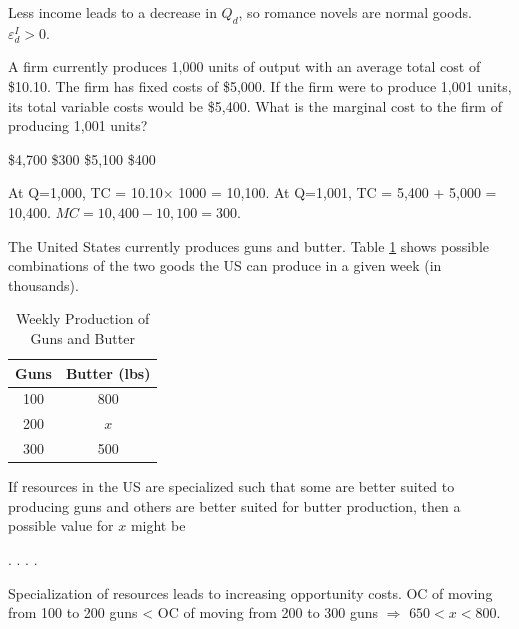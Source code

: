 \documentclass[addpoints,11pt]{exam}
\theoremstyle{definition}
\begin{document}
\begin{questions}
	\begin{solution}
		Less income leads to a decrease in $Q_d$, so romance novels are normal goods. $\varepsilon_d^I > 0$.
	\end{solution}
	
	\question A firm currently produces 1,000 units of output with an average total cost of \$10.10. The firm has fixed costs of \$5,000. If the firm were to produce 1,001 units, its total variable costs would be \$5,400. What is the marginal cost to the firm of producing 1,001 units?
		
		\begin{choices}
			\choice \$4,700
			\CorrectChoice \$300
			\choice \$5,100
			\choice \$400
		\end{choices}
		
		\begin{solution}
			At Q=1,000, TC = 10.10$\times$ 1000 = 10,100. At Q=1,001, TC = 5,400 + 5,000 = 10,400. $MC = 10,400-10,100 = 300$.
		\end{solution}
		
\newpage
	
	\question The United States currently produces guns and butter. Table \ref{MC22} shows possible combinations of the two goods the US can produce in a given week (in thousands). 
	
	\begin{table}[h!]
		\caption{Weekly Production of Guns and Butter}
		\centering
		\begin{tabular}{ c|c} 
			
			Guns & Butter (lbs) \\
			\hline
			100 & 800 \\
			200 & $x$  \\
			300 & 500 \\
		\end{tabular}
		\label{MC22}
	\end{table}
	
	If resources in the US are specialized such that some are better suited to producing guns and others are better suited for butter production, then a possible value for $x$ might be
	
	\begin{choices}
		\choice 650.
		\choice 550.
		\choice 600.
		\CorrectChoice 700.
	\end{choices}
	
	\begin{solution}
		Specialization of resources leads to increasing opportunity costs. OC of moving from 100 to 200 guns < OC of moving from 200 to 300 guns $\Rightarrow$ $  650 < x < 800$.
	\end{solution}
	

\end{questions}
\end{document}
